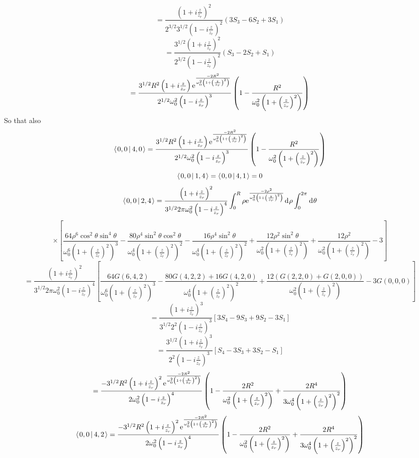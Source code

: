 \documentclass[11pt]{amsart}
\makeatletter
\newcommand{\e}{{\rm e}}				%
\newcommand{\msp}[1]{\mspace{#1mu}}		%
\newcommand{\0}{\varnothing}		%
\newcommand{\dd}{\msp{1} {\rm{d}} \msp{1}}	%
\newcommand{\brac}[2]{\left\langle\msp{2} #1\left\lvert \msp{3.5} #2 \right.\right\rangle}	%
\newcommand{\1}{!}
\newcommand{\2}{@}
\newcommand{\3}{\#}
\newcommand{\4}{\$}
\newcommand{\5}{\%}
\newcommand{\6}{$^\wedge$}
\newcommand{\7}{\&}
\newcommand{\8}{*}
\newcommand{\9}{(}
\makeatother
\begin{document}
\[
=\frac{\left(1+i\frac{z}{z_r}\right)^2}{2^{3/2}3^{1/2}\left(1-i\frac{z}{z_r}\right)^2}\left(3S_3-6S_2+3S_1\right)
\]
\[
=\frac{3^{1/2}\left(1+i\frac{z}{z_r}\right)^2}{2^{3/2}\left(1-i\frac{z}{z_r}\right)^2}\left(S_3-2S_2+S_1\right)
\]
\[
=\frac{3^{1/2}R^2\left(1+i\frac{z}{z_r}\right)\e^{\frac{-2R^2}{\omega_0^2\left(1+\left(\frac{z}{z_r}\right)^2\right)}}}{2^{1/2}\omega_0^2\left(1-i\frac{z}{z_r}\right)^3}\left(1-\frac{R^2}{\omega_0^2\left(1+\left(\frac{z}{z_r}\right)^2\right)}\right)
\]
So that also
\[
\brac{0,0}{4,0} =\frac{3^{1/2}R^2\left(1+i\frac{z}{z_r}\right)\e^{\frac{-2R^2}{\omega_0^2\left(1+\left(\frac{z}{z_r}\right)^2\right)}}}{2^{1/2}\omega_0^2\left(1-i\frac{z}{z_r}\right)^3}\left(1-\frac{R^2}{\omega_0^2\left(1+\left(\frac{z}{z_r}\right)^2\right)}\right)
\]
\[
\brac{0,0}{1,4} = \brac{0,0}{4,1} = 0
\]
\[
\brac{0,0}{2,4} = \frac{\left(1+i\frac{z}{z_r}\right)^2}{3^{1/2}2\pi\omega_0^2\left(1-i\frac{z}{z_r}\right)^4}\int_0^R\rho \e^{\frac{-2\rho^2}{\omega_0^2\left(1+\left(\frac{z}{z_r}\right)^2\right)}}\dd \rho \int_0^{2\pi} \dd \theta 
\]
\[
\times \left[\frac{64\rho^6\cos^2\theta\sin^4\theta}{\omega_0^6\left(1+\left(\frac{z}{z_r}\right)^2\right)^3}-\frac{80\rho^4\sin^2\theta\cos^2\theta}{\omega_0^4\left(1+\left(\frac{z}{z_r}\right)^2\right)^2}-\frac{16\rho^4\sin^2\theta}{\omega_0^4\left(1+\left(\frac{z}{z_r}\right)^2\right)^2}+\frac{12\rho^2\sin^2\theta}{\omega_0^2\left(1+\left(\frac{z}{z_r}\right)^2\right)} + \frac{12\rho^2}{\omega_0^2\left(1+\left(\frac{z}{z_r}\right)^2\right)} - 3\right]
\]
\[
=\frac{\left(1+i\frac{z}{z_r}\right)^2}{3^{1/2}2\pi\omega_0^2\left(1-i\frac{z}{z_r}\right)^4}\left[\frac{64G(6,4,2)}{\omega_0^6\left(1+\left(\frac{z}{z_r}\right)^2\right)^3}-\frac{80G(4,2,2)+16G(4,2,0)}{\omega_0^4\left(1+\left(\frac{z}{z_r}\right)^2\right)^2}+\frac{12\left(G(2,2,0)+G(2,0,0)\right)}{\omega_0^2\left(1+\left(\frac{z}{z_r}\right)^2\right)}-3G(0,0,0)\right]
\]
\[
=\frac{\left(1+i\frac{z}{z_r}\right)^3}{3^{1/2}2^2\left(1-i\frac{z}{z_r}\right)^3}\left[3S_4-9S_3+9S_2-3S_1\right]
\]
\[
=\frac{3^{1/2}\left(1+i\frac{z}{z_r}\right)^3}{2^2\left(1-i\frac{z}{z_r}\right)^3}\left[S_4-3S_3+3S_2-S_1\right]
\]
\[
=\frac{-3^{1/2}R^2\left(1+i\frac{z}{z_r}\right)^2\e^{\frac{-2R^2}{\omega_0^2\left(1+\left(\frac{z}{z_r}\right)^2\right)}}}{2\omega_0^2\left(1-i\frac{z}{z_r}\right)^4}\left(1-\frac{2R^2}{\omega_0^2\left(1+\left(\frac{z}{z_r}\right)^2\right)}+\frac{2R^4}{3\omega_0^4\left(1+\left(\frac{z}{z_r}\right)^2\right)^2}\right)
\]
\[
\brac{0,0}{4,2} = \frac{-3^{1/2}R^2\left(1+i\frac{z}{z_r}\right)^2\e^{\frac{-2R^2}{\omega_0^2\left(1+\left(\frac{z}{z_r}\right)^2\right)}}}{2\omega_0^2\left(1-i\frac{z}{z_r}\right)^4}\left(1-\frac{2R^2}{\omega_0^2\left(1+\left(\frac{z}{z_r}\right)^2\right)}+\frac{2R^4}{3\omega_0^4\left(1+\left(\frac{z}{z_r}\right)^2\right)^2}\right)
\]
\end{document}
